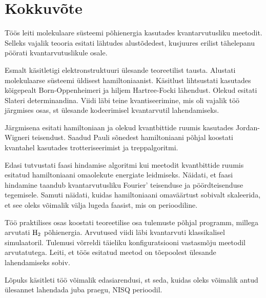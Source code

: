 \documentclass[12pt]{report}
\begin{document}
\chapter{Kokkuvõte}

Töös leiti molekulaare süsteemi põhienergia kasutades kvantarvutusliku meetodit.
Selleks vajalik teooria esitati lähtudes alustõdedest, kusjuures erilist tähelepanu pöörati kvantarvutuslikule osale.

Esmalt käsitletigi elektronstruktuuri ülesande teoreetilist tausta.
Alustati molekulaarse süsteemi üldisest hamiltoniaanist.
Käsitlust lihtsustati kasutades kõigepealt Born-Oppenheimeri ja hiljem Hartree-Focki lähendust.
Olekud esitati Slateri determinandina.
Viidi läbi teine kvantiseerimine, mis oli vajalik töö järgmises osas, st ülesande kodeerimisel kvantarvutil lahendamiseks.

Järgmisena esitati hamiltoniaan ja olekud kvantbittide ruumis kasutades Jordan-Wigneri teisendust.
Saadud Pauli sõnedest hamiltoniaani põhjal koostati kvantahel kasutades trotteriseerimist ja treppalgoritmi.

Edasi tutvustati faasi hindamise algoritmi kui meetodit kvantbittide ruumis esitatud hamiltoniaani omaolekute energiate leidmiseks.
Näidati, et faasi hindamine taandub kvantarvutusliku Fourier' teisenduse ja pöördteisenduse tegemisele.
Samuti näidati, kuidas hamiltoniaani omaväärtust sobivalt skaleerida, et see oleks võimalik välja lugeda faasist, mis on perioodiline.

Töö praktilises osas koostati teoreetilise osa tulemuste põhjal programm, millega arvutati \(\rm H_2\) põhienergia.
Arvutused viidi läbi kvantarvuti klassikalisel simulaatoril.
Tulemusi võrreldi täieliku konfiguratsiooni vastasmõju meetodil arvutatutega.
Leiti, et töös esitatud meetod on tõepoolest ülesande lahendamiseks sobiv.

Lõpuks käsitleti töö võimalik edasiarendusi, st seda, kuidas oleks võimalik antud ülesannet lahendada juba praegu, NISQ perioodil.

\printbibliography[heading=bibintoc, title=Kirjandus]
\end{document}
